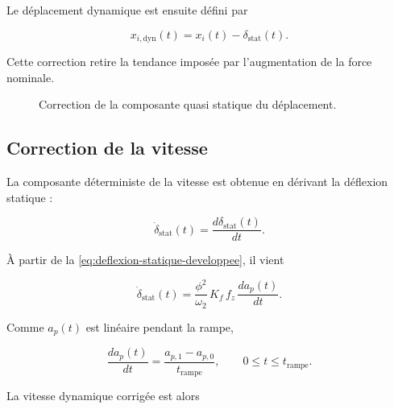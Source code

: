 \documentclass[
    11pt,
    a4paper
]{article}
\begin{document}
Le déplacement dynamique est ensuite défini par

\begin{equation}
    x_{i,\mathrm{dyn}}(t)
    =
    x_i(t)-\delta_{\mathrm{stat}}(t).
    \label{eq:deplacement-corrige}
\end{equation}

Cette correction retire la tendance imposée par l'augmentation de la force
nominale.

\begin{figure}[H]
    \centering
    \caption{Correction de la composante quasi statique du déplacement.}
    \label{fig:deplacement-corrige}
\end{figure}

\subsection{Correction de la vitesse}
\label{subsec:correction-vitesse}

La composante déterministe de la vitesse est obtenue en dérivant la déflexion
statique :

\begin{equation}
    \dot{\delta}_{\mathrm{stat}}(t)
    =
    \frac{d\delta_{\mathrm{stat}}(t)}{dt}.
    \label{eq:vitesse-statique}
\end{equation}

À partir de la \ref{eq:deflexion-statique-developpee}, il vient

\begin{equation}
    \dot{\delta}_{\mathrm{stat}}(t)
    =
    \frac{\phi^{2}}{\omega_2}\,
    K_f\,f_z\,
    \frac{da_p(t)}{dt}.
    \label{eq:vitesse-statique-developpee}
\end{equation}

Comme \(a_p(t)\) est linéaire pendant la rampe,

\begin{equation}
    \frac{da_p(t)}{dt}
    =
    \frac{a_{p,1}-a_{p,0}}{t_{\mathrm{rampe}}},
    \qquad
    0\leq t\leq t_{\mathrm{rampe}}.
    \label{eq:derivee-ap}
\end{equation}

La vitesse dynamique corrigée est alors
\end{document}
